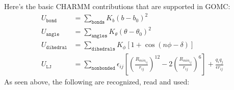 \documentclass[letterpaper,10pt,english]{sphinxmanual}
\begin{document}
\sphinxAtStartPar
Here’s the basic CHARMM contributions that are supported in GOMC:
\begin{equation*}
\begin{split}U_{\texttt{bond}}&=\sum_{\texttt{bonds}} K_b(b-b_0)^2\\
U_{\texttt{angle}}&=\sum_{\texttt{angles}} K_{\theta}(\theta-\theta_0)^2\\
U_{\texttt{dihedral}}&=\sum_{\texttt{dihedrals}} K_{\phi} [1+\cos(n\phi - \delta)]\\
U_{\texttt{LJ}}&=\sum_{\texttt{nonbonded}} \epsilon_{ij}\left[\left(\frac{R_{min_{ij}}}{r_{ij}}\right)^{12}-2\left(\frac{R_{min_{ij}}}{r_{ij}}\right)^6\right]+ \frac{q_i q_j}{\epsilon r_{ij}}\end{split}
\end{equation*}
\sphinxAtStartPar
As seen above, the following are recognized, read and used:
\end{document}
